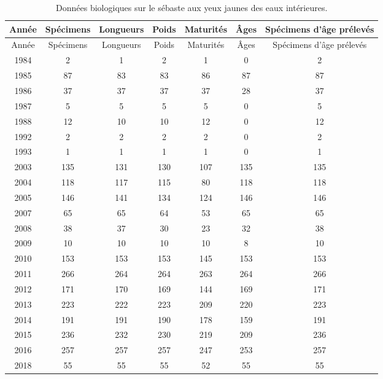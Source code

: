 \documentclass[french,11pt]{book}
\begin{document}
\hypertarget{tableau-ruxe9capitulatif-des-donnuxe9es-biologiques-accessibles}{%
\label{tableau-ruxe9capitulatif-des-donnuxe9es-biologiques-accessibles}}
\begin{longtable}[]{@{}ccccccc@{}}
\caption{\label{tab:test}Données biologiques sur le sébaste aux yeux jaunes des eaux intérieures.}\tabularnewline
\toprule
Année & Spécimens & Longueurs & Poids & Maturités & Âges & Spécimens d'âge prélevés \\
\midrule
\endfirsthead
\toprule
Année & Spécimens & Longueurs & Poids & Maturités & Âges & Spécimens d'âge prélevés \\
\midrule
\endhead
1984 & 2 & 1 & 2 & 1 & 0 & 2 \\
1985 & 87 & 83 & 83 & 86 & 87 & 87 \\
1986 & 37 & 37 & 37 & 37 & 28 & 37 \\
1987 & 5 & 5 & 5 & 5 & 0 & 5 \\
1988 & 12 & 10 & 10 & 12 & 0 & 12 \\
1992 & 2 & 2 & 2 & 2 & 0 & 2 \\
1993 & 1 & 1 & 1 & 1 & 0 & 1 \\
2003 & 135 & 131 & 130 & 107 & 135 & 135 \\
2004 & 118 & 117 & 115 & 80 & 118 & 118 \\
2005 & 146 & 141 & 134 & 124 & 146 & 146 \\
2007 & 65 & 65 & 64 & 53 & 65 & 65 \\
2008 & 38 & 37 & 30 & 23 & 32 & 38 \\
2009 & 10 & 10 & 10 & 10 & 8 & 10 \\
2010 & 153 & 153 & 153 & 145 & 153 & 153 \\
2011 & 266 & 264 & 264 & 263 & 264 & 266 \\
2012 & 171 & 170 & 169 & 144 & 169 & 171 \\
2013 & 223 & 222 & 223 & 209 & 220 & 223 \\
2014 & 191 & 191 & 190 & 178 & 159 & 191 \\
2015 & 236 & 232 & 230 & 219 & 209 & 236 \\
2016 & 257 & 257 & 257 & 247 & 253 & 257 \\
2018 & 55 & 55 & 55 & 52 & 55 & 55 \\
\bottomrule
\end{longtable}
\clearpage


\clearpage

\label{app:index-data}
\end{document}
